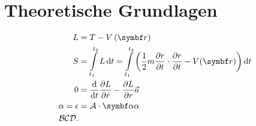 \chapter{Theoretische Grundlagen} \label{sec:theorie}

\begin{align*}
    L &= T - V\left(\vb{r}\right) \\
    S &= \int\limits_{t_1}^{t_2} L \dd{t} = \int\limits_{t_1}^{t_2} \left( \frac{1}{2} m \frac{\partial {r}}{\partial {t}} \cdot  \pdv{r}{t} - V(\vb{r} )  \right)  \dd{t}     \\
    0 &=  \dv{t} \pdv{L}{\dot{r}} - \pdv{L}{r} \vec{a} \\
    \alpha = \epsilon &= \mathcal{A} \cdot \vb{\alpha} \alpha   \\
    \mathcal{B C D}
.\end{align*}




